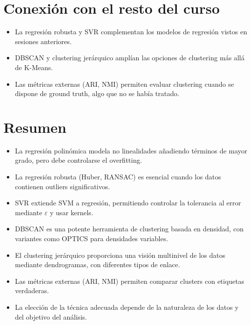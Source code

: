 \documentclass[12pt,a4paper,openany,oneside]{book}
\begin{document}
\section{Conexión con el resto del curso}
\begin{itemize}
    \item La regresión robusta y SVR complementan los modelos de regresión vistos en sesiones anteriores.
    \item DBSCAN y clustering jerárquico amplían las opciones de clustering más allá de K-Means.
    \item Las métricas externas (ARI, NMI) permiten evaluar clustering cuando se dispone de ground truth, algo que no se había tratado.
\end{itemize}

\section{Resumen}
\begin{itemize}
    \item La regresión polinómica modela no linealidades añadiendo términos de mayor grado, pero debe controlarse el overfitting.
    \item La regresión robusta (Huber, RANSAC) es esencial cuando los datos contienen outliers significativos.
    \item SVR extiende SVM a regresión, permitiendo controlar la tolerancia al error mediante \(\varepsilon\) y usar kernels.
    \item DBSCAN es una potente herramienta de clustering basada en densidad, con variantes como OPTICS para densidades variables.
    \item El clustering jerárquico proporciona una visión multinivel de los datos mediante dendrogramas, con diferentes tipos de enlace.
    \item Las métricas externas (ARI, NMI) permiten comparar clusters con etiquetas verdaderas.
    \item La elección de la técnica adecuada depende de la naturaleza de los datos y del objetivo del análisis.
\end{itemize}
\end{document}
